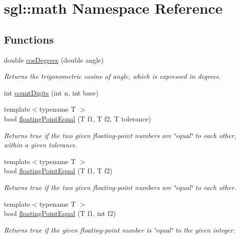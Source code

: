 \hypertarget{namespacesgl_1_1math}{}\section{sgl\+:\+:math Namespace Reference}
\label{namespacesgl_1_1math}
\subsection*{Functions}
\begin{DoxyCompactItemize}
\item 
double \mbox{\hyperlink{namespacesgl_1_1math_a6e4c47a9bfc745fbb9b66465054273a9}{cos\+Degrees}} (double angle)
\begin{DoxyCompactList}\small\item\em Returns the trigonometric cosine of {\ttfamily angle}, which is expressed in degrees. \end{DoxyCompactList}\item 
int \mbox{\hyperlink{namespacesgl_1_1math_a58fd413b2441967caf5813ad8f8b26f1}{count\+Digits}} (int n, int base)
\item 
{\footnotesize template$<$typename T $>$ }\\bool \mbox{\hyperlink{namespacesgl_1_1math_add01bae814eb24f1e846145efd48b16a}{floating\+Point\+Equal}} (T f1, T f2, T tolerance)
\begin{DoxyCompactList}\small\item\em Returns true if the two given floating-\/point numbers are \char`\"{}equal\char`\"{} to each other, within a given tolerance. \end{DoxyCompactList}\item 
{\footnotesize template$<$typename T $>$ }\\bool \mbox{\hyperlink{namespacesgl_1_1math_a982db7a5631eb2fd36d45dd2638a9bff}{floating\+Point\+Equal}} (T f1, T f2)
\begin{DoxyCompactList}\small\item\em Returns true if the two given floating-\/point numbers are \char`\"{}equal\char`\"{} to each other. \end{DoxyCompactList}\item 
{\footnotesize template$<$typename T $>$ }\\bool \mbox{\hyperlink{namespacesgl_1_1math_a7fa86fbe5be82bbbf397a13c24209f97}{floating\+Point\+Equal}} (T f1, int f2)
\begin{DoxyCompactList}\small\item\em Returns true if the given floating-\/point number is \char`\"{}equal\char`\"{} to the given integer. \end{DoxyCompactList}\item 

\end{DoxyCompactItemize}

